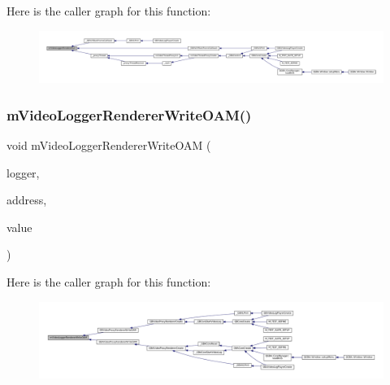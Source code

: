 Here is the caller graph for this function\+:
\nopagebreak
\begin{figure}[H]
\begin{center}
\leavevmode
\includegraphics[width=350pt]{video-logger_8c_ab790ed3e764c170c154f5781ecba758d_icgraph}
\end{center}
\end{figure}
\mbox{\label{video-logger_8c_abc3329514cd845af3704c8daabc1f626}} 
\subsubsection{\texorpdfstring{m\+Video\+Logger\+Renderer\+Write\+O\+A\+M()}{mVideoLoggerRendererWriteOAM()}}
{\footnotesize\ttfamily void m\+Video\+Logger\+Renderer\+Write\+O\+AM (\begin{DoxyParamCaption}\item[{struct m\+Video\+Logger $\ast$}]{logger,  }\item[{uint32\+\_\+t}]{address,  }\item[{uint16\+\_\+t}]{value }\end{DoxyParamCaption})}

Here is the caller graph for this function\+:
\nopagebreak
\begin{figure}[H]
\begin{center}
\leavevmode
\includegraphics[width=350pt]{video-logger_8c_abc3329514cd845af3704c8daabc1f626_icgraph}
\end{center}
\end{figure}
\mbox{\label{video-logger_8c_a00131ffac3e67e4c8615fe36d9aad49c}} 
